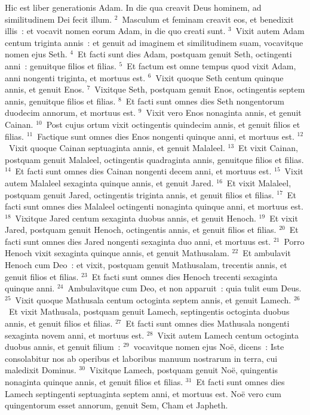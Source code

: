 \lettrine[lines=3,image=true,loversize=0.05,lraise=-0.03]{H}{}ic est liber generationis Adam. In die qua creavit Deus hominem, ad similitudinem Dei fecit illum.
${}^{2}$~Masculum et feminam creavit eos, et benedixit illis~: et vocavit nomen eorum Adam, in die quo creati sunt.
${}^{3}$~Vixit autem Adam centum triginta annis~: et genuit ad imaginem et similitudinem suam, vocavitque nomen ejus Seth.
${}^{4}$~Et facti sunt dies Adam, postquam genuit Seth, octingenti anni~: genuitque filios et filias.
${}^{5}$~Et factum est omne tempus quod vixit Adam, anni nongenti triginta, et mortuus est.
${}^{6}$~Vixit quoque Seth centum quinque annis, et genuit Enos.
${}^{7}$~Vixitque Seth, postquam genuit Enos, octingentis septem annis, genuitque filios et filias.
${}^{8}$~Et facti sunt omnes dies Seth nongentorum duodecim annorum, et mortuus est.
${}^{9}$~Vixit vero Enos nonaginta annis, et genuit Cainan.
${}^{10}$~Post cujus ortum vixit octingentis quindecim annis, et genuit filios et filias.
${}^{11}$~Factique sunt omnes dies Enos nongenti quinque anni, et mortuus est.
${}^{12}$~Vixit quoque Cainan septuaginta annis, et genuit Malaleel.
${}^{13}$~Et vixit Cainan, postquam genuit Malaleel, octingentis quadraginta annis, genuitque filios et filias.
${}^{14}$~Et facti sunt omnes dies Cainan nongenti decem anni, et mortuus est.
${}^{15}$~Vixit autem Malaleel sexaginta quinque annis, et genuit Jared.
${}^{16}$~Et vixit Malaleel, postquam genuit Jared, octingentis triginta annis, et genuit filios et filias.
${}^{17}$~Et facti sunt omnes dies Malaleel octingenti nonaginta quinque anni, et mortuus est.
${}^{18}$~Vixitque Jared centum sexaginta duobus annis, et genuit Henoch.
${}^{19}$~Et vixit Jared, postquam genuit Henoch, octingentis annis, et genuit filios et filias.
${}^{20}$~Et facti sunt omnes dies Jared nongenti sexaginta duo anni, et mortuus est.
${}^{21}$~Porro Henoch vixit sexaginta quinque annis, et genuit Mathusalam.
${}^{22}$~Et ambulavit Henoch cum Deo~: et vixit, postquam genuit Mathusalam, trecentis annis, et genuit filios et filias.
${}^{23}$~Et facti sunt omnes dies Henoch trecenti sexaginta quinque anni.
${}^{24}$~Ambulavitque cum Deo, et non apparuit~: quia tulit eum Deus.
${}^{25}$~Vixit quoque Mathusala centum octoginta septem annis, et genuit Lamech.
${}^{26}$~Et vixit Mathusala, postquam genuit Lamech, septingentis octoginta duobus annis, et genuit filios et filias.
${}^{27}$~Et facti sunt omnes dies Mathusala nongenti sexaginta novem anni, et mortuus est.
${}^{28}$~Vixit autem Lamech centum octoginta duobus annis, et genuit filium~:
${}^{29}$~vocavitque nomen ejus No\"e, dicens~: Iste consolabitur nos ab operibus et laboribus manuum nostrarum in terra, cui maledixit Dominus.
${}^{30}$~Vixitque Lamech, postquam genuit No\"e, quingentis nonaginta quinque annis, et genuit filios et filias.
${}^{31}$~Et facti sunt omnes dies Lamech septingenti septuaginta septem anni, et mortuus est. No\"e vero cum quingentorum esset annorum, genuit Sem, Cham et Japheth.

